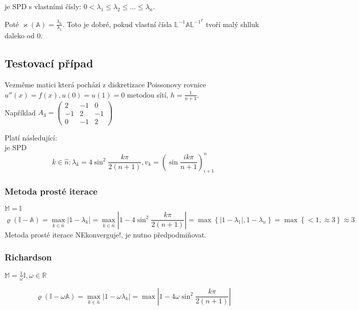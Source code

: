 \documentclass[../main.tex]{subfiles}
\begin{document}
\matA je SPD s vlastními čísly: $0 < \lambda_1 \leq \lambda_2 \leq \dots \leq \lambda_n$.

Poté $\varkappa(\mathbb{A}) = \frac{\lambda_n}{\lambda_1}$. Toto je dobré, pokud vlastní čísla $\mathbb{L}^{-1}\mathbb{A}\mathbb{L}^{-1^T}$ tvoří malý shlluk daleko od 0.



\subsection{Testovací případ}
Vezměme matici \matA která pochází z diskretizace Poissonovy rovnice $u''(x)=f(x), u(0)=u(1)=0$ metodou sítí, $h = \frac{1}{n+1}$.\\

Například $A_3 = \begin{pmatrix}
    2 & -1 & 0\\
    -1 & 2 & -1 \\
    0 & -1 & 2
\end{pmatrix}$

Platí následující:\\
\matA je SPD 
\begin{equation*}
    k\in\hat{n}: \lambda_k = 4 \sin^2 \frac{k\pi}{2(n+1)}, v_k = \left( \sin \frac{i k \pi}{n+1}\right)^n_{i+1}
\end{equation*}
    
\subsubsection{Metoda prosté iterace}
$\mathbb{M} = \mathbb{I}$
\begin{equation*}
    \varrho(\mathbb{I} - \mathbb{A}) = \max_{k\in\hat{n}} |1-\lambda_k| = \max_{k\in\hat{n}} |1 - 4 \sin^2 \frac{k\pi}{2(n+1)}|
    = \max \left\{ |1-\lambda_1|, 1 - \lambda_n  \right\} = \max \left\{ < 1, \approx 3  \right\} \approx 3
\end{equation*}
Metoda prosté iterace NEkonverguje!, je nutno předpodmiňovat.



\subsubsection{Richardson}
$\mathbb{M} = \frac{1}{\omega} \mathbb{I}, \omega\in\mathbb{R}$


\begin{equation*}
    \varrho(\mathbb{I} - \omega \mathbb{A}) = \max_{k\in\hat{n}} |1-\omega\lambda_k| = \max |1 - 4\omega \sin^2 \frac{k\pi}{2(n+1)}|
\end{equation*}
\end{document}
